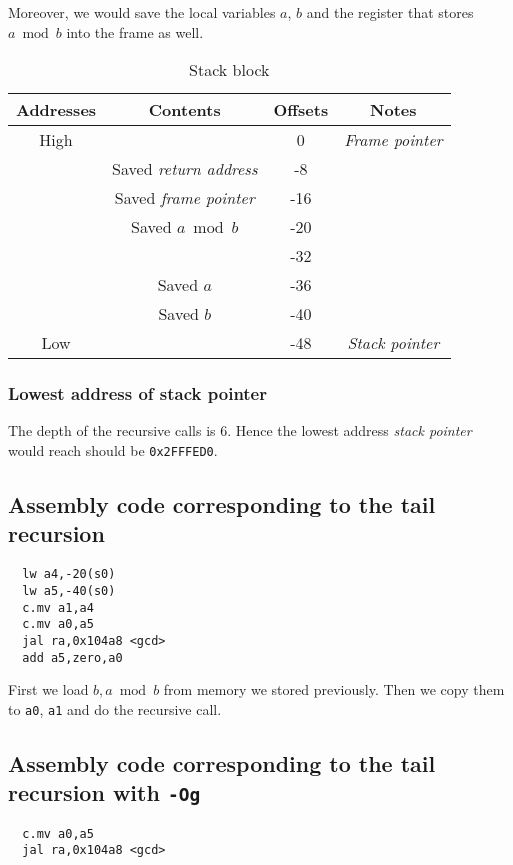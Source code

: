 \documentclass[12pt, a4paper]{article}
\begin{document}
Moreover, we would save the local variables $a$, $b$ and the register that stores $a\bmod b$ into the frame as well.

\begin{table}[H]
\caption{Stack block}
\centering
\begin{tabular}{cccc}
\hline
Addresses & Contents & Offsets & Notes \\
\hline\hline
High & & 0 & \textit{Frame pointer} \\
 & Saved \textit{return address} & -8 & \\
 & Saved \textit{frame pointer} & -16 & \\
 & Saved $a\bmod b$ & -20 & \\
 & & -32 & \\
 & Saved $a$ & -36 & \\
 & Saved $b$ & -40 & \\
Low & & -48 & \textit{Stack pointer} \\
\hline
\end{tabular}
\label{stack frame}
\end{table}

\subsubsection{Lowest address of stack pointer}

The depth of the recursive calls is 6. Hence the lowest address \textit{stack pointer} would reach should be \texttt{0x2FFFED0}.

\subsection{Assembly code corresponding to the tail recursion}

\begin{verbatim}
  lw a4,-20(s0)
  lw a5,-40(s0)
  c.mv a1,a4
  c.mv a0,a5
  jal ra,0x104a8 <gcd>
  add a5,zero,a0
\end{verbatim}

First we load $b,a\bmod b$ from memory we stored previously. Then we copy them to \texttt{a0}, \texttt{a1} and do the recursive call.

\subsection{Assembly code corresponding to the tail recursion with \texttt{-Og}}

\begin{verbatim}
  c.mv a0,a5
  jal ra,0x104a8 <gcd>
\end{verbatim}
\end{document}
